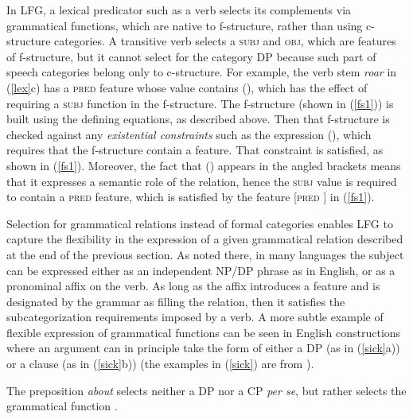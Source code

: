 In LFG, a lexical predicator such as a verb selects its complements via grammatical functions, which are native to f-structure, rather than using c-structure categories.  A transitive verb selects a \textsc{subj} and \textsc{obj}, which are features of f-structure, but it cannot select for the category DP because such part of speech categories belong only to c-structure.  For example, the verb stem \textit{roar} in (\ref{lex}c) has a \textsc{pred} feature whose value contains (\up {}), which has the effect of requiring a \textsc{subj} function in the f-structure.    The f-structure (shown in (\ref{fs1})) is built using the defining equations, as described above.  Then that f-structure is checked against any \textit{existential constraints} such as  the expression (\up {}), which requires that the f-structure contain a  feature.  That constraint is satisfied, as shown in (\ref{fs1}).  Moreover, the fact that (\up {}) appears in the angled brackets means that it expresses a semantic role of the  relation, hence the \textsc{subj} value is required to contain a \textsc{pred} feature, which is satisfied by the feature [\textsc{pred} ] in  (\ref{fs1}).  



Selection for grammatical relations instead of formal categories enables LFG to capture the  flexibility in the expression of a given grammatical relation described at the end of the previous section.  As noted there, in many languages the subject can be expressed either as an independent NP/DP phrase as in English, or as a pronominal affix on the verb.  As long as the affix introduces a  feature and is designated by the grammar as filling the  relation, then it satisfies the subcategorization requirements imposed by a verb.  A more subtle example of flexible expression of grammatical functions  can be seen in English constructions where an argument can in principle take the form of either a DP (as in (\ref{sick}a)) or a clause (as in (\ref{sick}b)) (the examples in (\ref{sick}) are from \citealt[11--12]{BATW2016a}).  

\eal 
 \label{sick}




\zl
The preposition \textit{about} selects neither a DP nor a CP \textit{per se}, but rather selects the grammatical function  .

